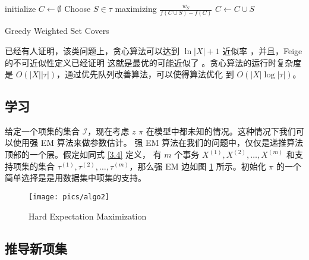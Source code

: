 \documentclass{ctexart}
\newcommand{\scri}[0]{\mathcal{I}}
\begin{document}
\begin{algorithm}[H]
	initialize $C \leftarrow \emptyset$ \;
	 {
		Choose $S \in \tau$ maximizing $\frac{w_S}{ f(C \cup {S}) - f(C) }$ \;
		$C \leftarrow C \cup {S}$ \;
	}
\caption{Greedy Weighted Set Covers}
\end{algorithm}

已经有人证明，该类问题上，贪心算法可以达到 $\ln |X| + 1$ 近似率 \cite{chivatal}，并且，Feige 的不可近似性定义已经证明
这就是最优的可能近似了 \cite{feige}。贪心算法的运行时复杂度是 $O(|X| |\tau|)$，通过优先队列改善算法，可以使得算法优化
到 $O(|X| \log |\tau|)$。

\subsection{学习}

给定一个项集的集合 $\scri$，现在考虑 $z$ $\pi$ 在模型中都未知的情况。这种情况下我们可以使用强 EM 算法来做参数估计。
强 EM 算法在我们的问题中，仅仅是递推算法顶部的一个层。假定如同式 \ref{3.4} 定义，
有 $m$ 个事务 $X^{(1)}, X^{(2)}, \dots, X^{(m)} $ 和支持项集的集合
$\tau^{(1)}, \tau^{(2)}, \dots, \tau^{(m)} $，那么强 EM 边如图 \ref{fig:algo2} 所示。初始化 $\pi$ 的一个简单选择是是用数据集中项集的支持。

\begin{figure}
\centering
\texttt{[image: pics/algo2]}
\caption{Hard Expectation Maximization}
\label{fig:algo2}
\end{figure}

\subsection{推导新项集}

\pagebreak

\end{document}
